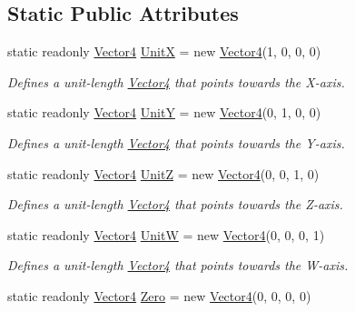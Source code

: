 \subsection*{Static Public Attributes}
\begin{DoxyCompactItemize}
\item 
static readonly \hyperlink{struct_open_t_k_1_1_vector4}{Vector4} \hyperlink{struct_open_t_k_1_1_vector4_ad3b78911d7b6438c95ec666d49698487}{Unit\-X} = new \hyperlink{struct_open_t_k_1_1_vector4}{Vector4}(1, 0, 0, 0)
\begin{DoxyCompactList}\small\item\em Defines a unit-\/length \hyperlink{struct_open_t_k_1_1_vector4}{Vector4} that points towards the X-\/axis. \end{DoxyCompactList}\item 
static readonly \hyperlink{struct_open_t_k_1_1_vector4}{Vector4} \hyperlink{struct_open_t_k_1_1_vector4_a1396b403dd251cb508210d93751494e5}{Unit\-Y} = new \hyperlink{struct_open_t_k_1_1_vector4}{Vector4}(0, 1, 0, 0)
\begin{DoxyCompactList}\small\item\em Defines a unit-\/length \hyperlink{struct_open_t_k_1_1_vector4}{Vector4} that points towards the Y-\/axis. \end{DoxyCompactList}\item 
static readonly \hyperlink{struct_open_t_k_1_1_vector4}{Vector4} \hyperlink{struct_open_t_k_1_1_vector4_ad269575f7cc9936e91f79f89c3fb1b48}{Unit\-Z} = new \hyperlink{struct_open_t_k_1_1_vector4}{Vector4}(0, 0, 1, 0)
\begin{DoxyCompactList}\small\item\em Defines a unit-\/length \hyperlink{struct_open_t_k_1_1_vector4}{Vector4} that points towards the Z-\/axis. \end{DoxyCompactList}\item 
static readonly \hyperlink{struct_open_t_k_1_1_vector4}{Vector4} \hyperlink{struct_open_t_k_1_1_vector4_ac56f2979d015c23002983614a97b3226}{Unit\-W} = new \hyperlink{struct_open_t_k_1_1_vector4}{Vector4}(0, 0, 0, 1)
\begin{DoxyCompactList}\small\item\em Defines a unit-\/length \hyperlink{struct_open_t_k_1_1_vector4}{Vector4} that points towards the W-\/axis. \end{DoxyCompactList}\item 
static readonly \hyperlink{struct_open_t_k_1_1_vector4}{Vector4} \hyperlink{struct_open_t_k_1_1_vector4_a4ee26a366cfffb3bf6ee42ce1c9d53c4}{Zero} = new \hyperlink{struct_open_t_k_1_1_vector4}{Vector4}(0, 0, 0, 0)

\end{DoxyCompactItemize}
